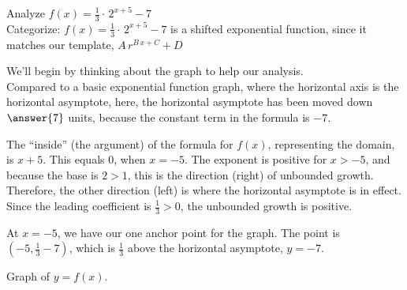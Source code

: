 \documentclass{ximera}
\begin{document}
\begin{example}  



Analyze   $f(x) = \frac{1}{3} \cdot \, 2^{x+5} - 7$ \\



Categorize:   $f(x) = \frac{1}{3} \cdot \, 2^{x+5} - 7$ is a shifted exponential function, since it matches our template, $A \, r^{B \, x + C} + D$



\begin{idea}


We'll begin by thinking about the graph to help our analysis. \\

Compared to a basic exponential function graph, where the horizontal axis is the horizontal asymptote, here, the horizontal asymptote has been moved down $\answer{7}$ units, because the constant term in the formula is $-7$.



The ``inside'' (the argument) of the formula for $f(x)$, representing the domain, is $x+5$.  This equals $0$, when $x=-5$.  The exponent is positive for $x>-5$, and because the base is $2 > 1$, this is the direction (right) of unbounded growth.  Therefore, the other direction (left) is where the horizontal asymptote is in effect.  Since the leading coefficient is $\frac{1}{3} > 0$, the unbounded growth is positive.

At $x=-5$, we have our one anchor point for the graph.  The point is $\left(-5, \frac{1}{3} - 7 \right)$, which is $\frac{1}{3}$ above the horizontal asymptote, $y = -7$.


Graph of $y = f(x)$.

\begin{image}
\end{image}
\end{idea}
\end{example}
\end{document}
